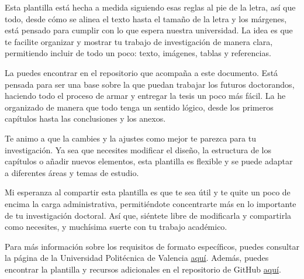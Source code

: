 Esta plantilla está hecha a medida siguiendo esas reglas al pie de la letra, así que todo, desde cómo se alinea el texto hasta el tamaño de la letra y los márgenes, está pensado para cumplir con lo que espera nuestra universidad. La idea es que te facilite organizar y mostrar tu trabajo de investigación de manera clara, permitiendo incluir de todo un poco: texto, imágenes, tablas y referencias.

La puedes encontrar en el repositorio que acompaña a este documento. Está pensada para ser una base sobre la que puedan trabajar los futuros doctorandos, haciendo todo el proceso de armar y entregar la tesis un poco más fácil. La he organizado de manera que todo tenga un sentido lógico, desde los primeros capítulos hasta las conclusiones y los anexos.

Te animo a que la cambies y la ajustes como mejor te parezca para tu investigación. Ya sea que necesites modificar el diseño, la estructura de los capítulos o añadir nuevos elementos, esta plantilla es flexible y se puede adaptar a diferentes áreas y temas de estudio.

Mi esperanza al compartir esta plantilla es que te sea útil y te quite un poco de encima la carga administrativa, permitiéndote concentrarte más en lo importante de tu investigación doctoral. Así que, siéntete libre de modificarla y compartirla como necesites, y muchísima suerte con tu trabajo académico.

Para más información sobre los requisitos de formato específicos, puedes consultar la página de la Universidad Politécnica de Valencia \href{https://www.upv.es/contenidos/DOCINF/info/}{aquí}. Además, puedes encontrar la plantilla y recursos adicionales en el repositorio de GitHub \href{https://github.com/crissmath/Thesis_DISCA_template.git}{aquí}.
